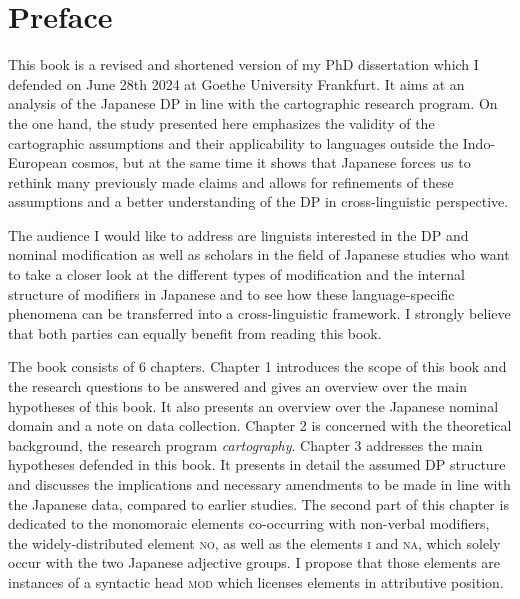 \documentclass [output=book,colorlinks,citecolor=brown]{langscibook}
\begin{document}

\maketitle
\frontmatter
{} %
{\sloppy\tableofcontents}
 
 
 
\mainmatter



% 

\chapter*{Preface}

This book is a revised and shortened version of my PhD dissertation which I defended on June 28th 2024 at Goethe University Frankfurt. It aims at an analysis of the Japanese DP in line with the cartographic research program. On the one hand, the study presented here emphasizes the validity of the cartographic assumptions and their applicability to languages outside the Indo-European cosmos, but at the same time it shows that Japanese forces us to rethink many previously made claims and allows for refinements of these assumptions and a better understanding of the DP in cross-linguistic perspective.

The audience I would like to address are linguists interested in the DP and nominal modification as well as scholars in the field of Japanese studies who want to take a closer look at the different types of modification and the internal structure of modifiers in Japanese and to see how these language-specific phenomena can be transferred into a cross-linguistic framework. I strongly believe that both parties can equally benefit from reading this book.

The book consists of 6 chapters. Chapter 1 introduces the scope of this book and the research questions to be answered and gives an overview over the main hypotheses of this book. It also presents an overview over the Japanese nominal domain and a note on data collection. Chapter 2 is concerned with the theoretical background, the research program \textit{cartography}. Chapter 3 addresses the main hypotheses defended in this book. It presents in detail the assumed DP structure and discusses the implications and necessary amendments to be made in line with the Japanese data, compared to earlier studies. The second part of this chapter is dedicated to the monomoraic elements co-occurring with non-verbal modifiers, the widely-distributed element \textsc{no}, as well as the elements \textsc{i} and \textsc{na}, which solely occur with the two Japanese adjective groups. I propose that those elements are instances of a syntactic head \textsc{mod} which licenses elements in attributive position.
\end{document}

